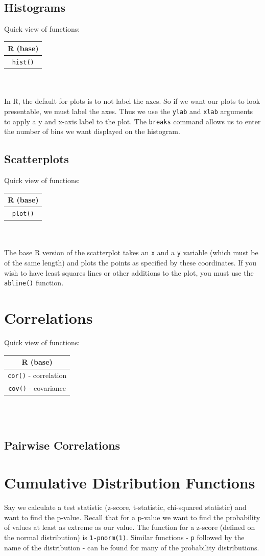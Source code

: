 \documentclass[11pt,letterpaper,fleqn]{report}
\begin{document}
\section{Histograms}
Quick view of functions:
\begin{tabular}{c}
R (base) \\
\hline
\texttt{hist()}
\end{tabular}\\
\\
In R, the default for plots is to not label the axes. So if we want our plots to look presentable, we must label the axes. Thus we use the \texttt{ylab} and \texttt{xlab} arguments to apply a y and x-axis label to the plot. The \texttt{breaks} command allows us to enter the number of bins we want displayed on the histogram.

\section{Scatterplots}
Quick view of functions:
\begin{tabular}{c}
R (base) \\
\hline
\texttt{plot()}
\end{tabular}\\
\\
The base R version of the scatterplot takes an \texttt{x} and a \texttt{y} variable (which must be of the same length) and plots the points as specified by these coordinates. If you wish to have least squares lines or other additions to the plot, you must use the \texttt{abline()} function. 

\chapter{Correlations}
Quick view of functions:
\begin{tabular}{c}
R (base)\\
\hline
\texttt{cor()} - correlation\\
\texttt{cov()} - covariance  
  \end{tabular}\\
\\

\section{Pairwise Correlations}

\chapter{Cumulative Distribution Functions}
Say we calculate a test statistic (z-score, t-statistic, chi-squared statistic) and want to find the p-value. Recall that for a p-value we want to find the probability of values at least as extreme as our value. The function for a z-score (defined on the normal distribution) is \texttt{1-pnorm(1)}. Similar functions - \texttt{p} followed by the name of the distribution - can be found for many of the probability distributions.
\end{document}
